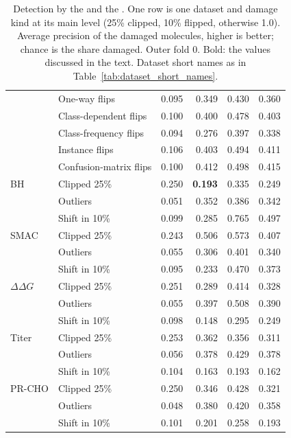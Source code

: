 \begin{table}[htbp]
\begin{tabular}{@{}llrrrr@{}}
 & One-way flips & 0.095 & 0.349 & 0.430 & 0.360 \\
 & Class-dependent flips & 0.100 & 0.400 & 0.478 & 0.403 \\
 & Class-frequency flips &0.094 & 0.276 & 0.397 & 0.338 \\
 & Instance flips & 0.106 & 0.403 & 0.494 & 0.411 \\
 & Confusion-matrix flips & 0.100 & 0.412 & 0.498 & 0.415 \\
BH & Clipped 25\% & 0.250 & \textbf{0.193} & 0.335 & 0.249 \\
 & Outliers & 0.051 & 0.352 & 0.386 & 0.342 \\
 & Shift in 10\% & 0.099 & 0.285 & 0.765 & 0.497 \\
SMAC & Clipped 25\% & 0.243 & 0.506 & 0.573 & 0.407 \\
 & Outliers & 0.055 & 0.306 & 0.401 & 0.340 \\
 & Shift in 10\% & 0.095 & 0.233 & 0.470 & 0.373 \\
$\Delta\Delta G$ & Clipped 25\% & 0.251 & 0.289 & 0.414 & 0.328 \\
 & Outliers & 0.055 & 0.397 & 0.508 & 0.390 \\
 & Shift in 10\% & 0.098 & 0.148 & 0.295 & 0.249 \\
Titer & Clipped 25\% & 0.253 & 0.362 & 0.356 & 0.311 \\
 & Outliers & 0.056 & 0.378 & 0.429 & 0.378 \\
 & Shift in 10\% & 0.104 & 0.163 & 0.193 & 0.162 \\
PR-CHO & Clipped 25\% & 0.250 & 0.346 & 0.428 & 0.321 \\
 & Outliers & 0.048 & 0.380 & 0.420 & 0.358 \\
 & Shift in 10\% & 0.101 & 0.201 & 0.258 & 0.193 \\
\bottomrule
\end{tabular}
\caption[Detection by the Forest residual and the Cliff-aware gap.]{Detection by the  and the . One row is one dataset and damage kind at its main level (25\% clipped, 10\% flipped, otherwise 1.0). Average precision of the damaged molecules, higher is better; chance is the share damaged. Outer fold 0. Bold: the values discussed in the text. Dataset short names as in Table~\ref{tab:dataset_short_names}.}
\label{tab:noise:res:detect_residual}
\end{table}

